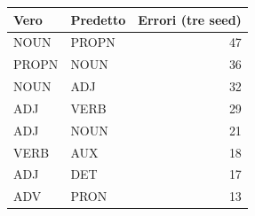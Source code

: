 \begin{tabular}{llr}
\toprule
Vero & Predetto & Errori (tre seed) \\
\midrule
NOUN & PROPN & 47 \\
PROPN & NOUN & 36 \\
NOUN & ADJ & 32 \\
ADJ & VERB & 29 \\
ADJ & NOUN & 21 \\
VERB & AUX & 18 \\
ADJ & DET & 17 \\
ADV & PRON & 13 \\
\bottomrule
\end{tabular}